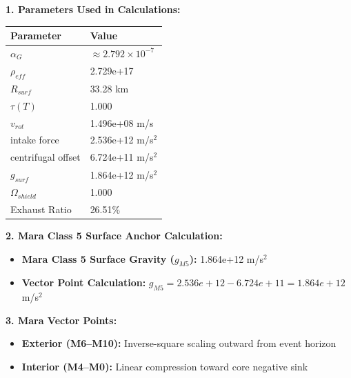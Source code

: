 \documentclass[11pt, a4paper]{article}
\begin{document}
\vspace{0.5em}
\noindent \textbf{1. Parameters Used in Calculations:}
\begin{center}
  \begin{tabular}{|l|l|}
    \hline
    \textbf{Parameter} & \textbf{Value} \\ \hline
    $\alpha_G$ & $\approx 2.792 \times 10^{-7}$ \\ \hline
    $\rho_{eff}$ & 2.729e+17 \\ \hline
    $R_{surf}$ & 33.28 km \\ \hline
    $\tau(T)$ & 1.000 \\ \hline
    $v_{rot}$ & 1.496e+08 m/s \\ \hline
    intake force & 2.536e+12 m/s$^2$ \\ \hline
    centrifugal offset & 6.724e+11 m/s$^2$ \\ \hline
    $g_{surf}$ & 1.864e+12 m/s$^2$ \\ \hline
    $\Omega_{shield}$ & 1.000 \\ \hline
    Exhaust Ratio & 26.51\% \\ \hline
  \end{tabular}
\end{center}

\vspace{0.5em}
\noindent \textbf{2. Mara Class 5 Surface Anchor Calculation:}
\begin{itemize}
  \item \textbf{Mara Class 5 Surface Gravity ($g_{M5}$):} 1.864e+12 m/s$^2$
  \item \textbf{Vector Point Calculation:} $g_{M5} = 2.536e+12 - 6.724e+11 = 1.864e+12$ m/s$^2$
\end{itemize}

\vspace{0.5em}
\noindent \textbf{3. Mara Vector Points:}
\begin{itemize}
  \item \textbf{Exterior (M6--M10):} Inverse-square scaling outward from event horizon
  \item \textbf{Interior (M4--M0):} Linear compression toward core negative sink
\end{itemize}
\end{document}
